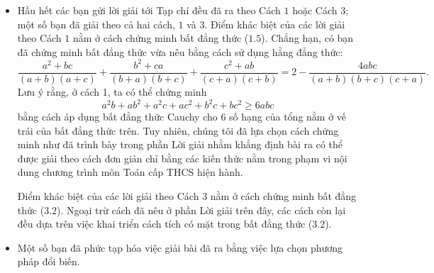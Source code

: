 \begin{bt}
{\begin{nx}
\begin{itemize}
\begin{itemize}
$$ \dfrac{a_1 + a_2 + \ldots + a_n}{n} \geq \sqrt[n]{a_1 a_2 \ldots a_n}. $$
\noindent Dấu bằng xảy ra khi và chỉ khi 
$a_1 = a_2 = \cdots = a_n.$
\item \textit{Bất đẳng thức Bunhiacopxki cho $2$ bộ $n$ số thức $\left(a_1, a_2, \ldots, a_n\right)$ và $\left(b_1, b_2, \ldots, b_n\right)$ $($$n$ nguyên lớn hơn $1$$)$}: 
$$\left(a_1^2 + a_2^2 + \ldots + a_n^2\right)\left(b_1^2 + b_2^2 + \ldots + b_n^2 \right) \geq \left(a_1b_1 + a_2 b_2 + \ldots a_nb_n\right)^2.$$
Dấu bằng xảy ra khi và chỉ khi
$\dfrac{a_1}{b_1} = \dfrac{a_2}{b_2} = \cdots = \dfrac{a_n}{b_n}.$
\noindent Bất đẳng thức Bunhiacopxki còn được gọi là bất đẳng thức Cauchy-Bunhiacopxki hoặc Cauchy-Schwarz.\medskip
\end{itemize}
\item  Hầu hết các bạn gửi lời giải tới Tạp chí đều đã ra theo Cách $1$ hoặc Cách $3$; một số bạn đã giải theo cả hai cách, $1$ và $3$.
Điểm khác biệt của các lời giải theo Cách $1$ nằm ở cách chứng minh bất đẳng thức ($1.5$). Chẳng hạn, có bạn đã chứng minh bất đẳng thức vừa nêu bằng cách sử dụng hằng đẳng thức:
$$\dfrac{a^2 + bc}{(a + b)(a + c)} + \dfrac{b^2 + ca}{(b + a)(b + c)} + \dfrac{c^2 + ab}{(c + a)(c + b)} = 2 - \dfrac{4abc}{(a + b)(b + c)(c + a)}.$$
Lưu ý rằng, ở cách 1, ta có thể chứng minh
$$a^2b+ab^2+a^2c+ac^2+b^2c+bc^2\ge 6abc$$
bằng cách áp dụng bất đẳng thức Cauchy cho $6$ số hạng của tổng nằm ở vế trái của bất đẳng thức trên. Tuy nhiên, chúng tôi đã lựa chọn cách chứng minh như đã trình bày trong phần Lời giải nhằm khẳng định bài ra có thể được giải theo cách đơn giản chỉ bằng các kiến thức nằm trong phạm vi nội dung chương trình môn Toán cấp THCS hiện hành. \medskip

\noindent Điểm khác biệt của các lời giải theo Cách $3$ nằm ở cách chứng minh bất đẳng thức ($3.2$). Ngoại trừ cách đã nêu ở phần Lời giải trên đây, các cách còn lại đều dựa trên việc khai triển cách tích có mặt trong bất đẳng thức ($3.2$).\medskip

\item  Một số bạn đã phức tạp hóa việc giải bài đã ra bằng việc lựa chọn phương pháp đổi biến. \medskip


\end{itemize}
\end{nx}}
\end{bt}
